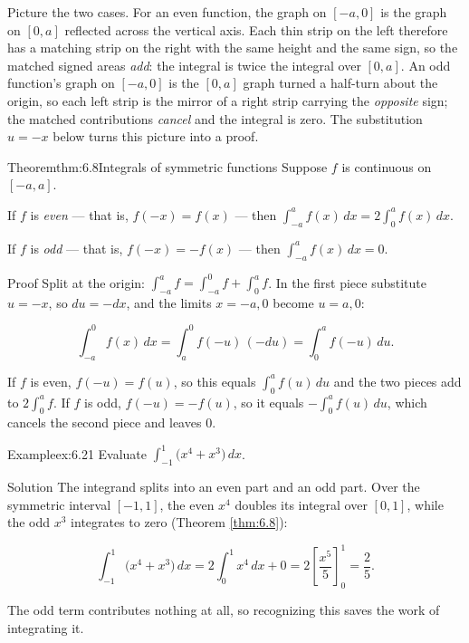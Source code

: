 \documentclass[a4paper,12pt,oneside]{memoir}
\begin{document}
Picture the two cases. For an even function, the graph on \([-a, 0]\) is the graph on \([0, a]\) reflected across the vertical axis. Each thin strip on the left therefore has a matching strip on the right with the same height and the same sign, so the matched signed areas \emph{add}: the integral is twice the integral over \([0, a]\). An odd function’s graph on \([-a, 0]\) is the \([0, a]\) graph turned a half-turn about the origin, so each left strip is the mirror of a right strip carrying the \emph{opposite} sign; the matched contributions \emph{cancel} and the integral is zero. The substitution \(u = -x\) below turns this picture into a proof.

\begin{envtheorem}{Theorem}{thm:6.8}{Integrals of symmetric functions}
Suppose \(f\) is continuous on \([-a, a]\).

\begin{steps}
  \item If \(f\) is \emph{even} — that is, \(f(-x) = f(x)\) — then \(\displaystyle\int_{-a}^{a} f(x)\,dx = 2\int_{0}^{a} f(x)\,dx\).
  \item If \(f\) is \emph{odd} — that is, \(f(-x) = -f(x)\) — then \(\displaystyle\int_{-a}^{a} f(x)\,dx = 0\).
\end{steps}
\end{envtheorem}
\begin{envproof}{Proof}{}{}
Split at the origin: \(\int_{-a}^{a} f = \int_{-a}^{0} f + \int_{0}^{a} f\). In the first piece substitute \(u = -x\), so \(du = -dx\), and the limits \(x = -a, 0\) become \(u = a, 0\):

\[ \int_{-a}^{0} f(x)\,dx = \int_{a}^{0} f(-u)\,(-du) = \int_{0}^{a} f(-u)\,du. \]

If \(f\) is even, \(f(-u) = f(u)\), so this equals \(\int_{0}^{a} f(u)\,du\) and the two pieces add to \(2\int_{0}^{a} f\). If \(f\) is odd, \(f(-u) = -f(u)\), so it equals \(-\int_{0}^{a} f(u)\,du\), which cancels the second piece and leaves \(0\). \qedmark
\end{envproof}
\begin{workedexample}
\begin{envexample}{Example}{ex:6.21}{}
Evaluate \(\displaystyle\int_{-1}^{1} \bigl(x^{4} + x^{3}\bigr)\,dx\).
\end{envexample}
\begin{envsolution}{Solution}{}{}
The integrand splits into an even part and an odd part. Over the symmetric interval \([-1, 1]\), the even \(x^{4}\) doubles its integral over \([0, 1]\), while the odd \(x^{3}\) integrates to zero (Theorem \ref{thm:6.8}):

\[ \int_{-1}^{1} \bigl(x^{4} + x^{3}\bigr)\,dx = 2\int_{0}^{1} x^{4}\,dx + 0 = 2\left[\frac{x^{5}}{5}\right]_{0}^{1} = \frac{2}{5}. \]

The odd term contributes nothing at all, so recognizing this saves the work of integrating it. \qedmark
\end{envsolution}
\end{workedexample}
\end{document}

